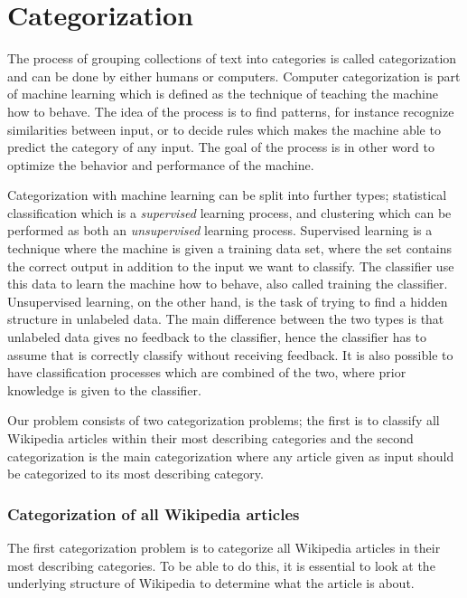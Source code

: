 \section{Categorization}
The process of grouping collections of text into categories is called categorization and can be done by either humans or computers. Computer categorization is part of machine learning which is defined as the technique of teaching the machine how to behave. The idea of the  process is to find patterns, for instance recognize similarities between input, or to decide rules which makes the machine able to predict the category of any input. The goal of the process is in other word to optimize the behavior and performance of the machine.

Categorization with machine learning can be split into further types; statistical classification which is a \textit{supervised} learning process, and clustering which can be performed as both %
an \textit{unsupervised} learning process. Supervised learning is a technique where the machine is given a training data set, where the set contains the correct output in addition to the input we want to classify. The classifier use this data to learn the machine how to behave, also called training the classifier. Unsupervised learning, on the other hand, is the task of trying to find a hidden structure in unlabeled data. The main difference between the two types is that unlabeled data gives no feedback to the classifier, hence the classifier has to assume that is correctly classify without receiving feedback. It is also possible to have classification processes which are combined of the two, where prior knowledge is given to the classifier. 


Our problem consists of two categorization problems; the first is to classify all Wikipedia articles within their most describing categories and the second categorization is the main categorization where any article given as input should be categorized to its most describing category.  

\subsubsection{Categorization of all Wikipedia articles}
The first categorization problem is to categorize all Wikipedia articles in their most describing categories. To be able to do this, it is essential to look at the underlying structure of Wikipedia to determine what the article is about. 

